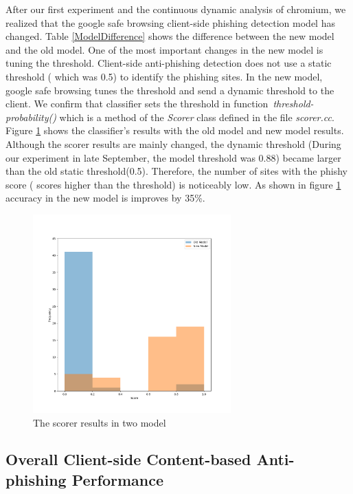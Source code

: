 After our first experiment and the continuous dynamic analysis of chromium, we realized that the google safe browsing client-side phishing detection model has changed. 
Table \ref{ModelDifference} shows the difference between the new model and the old model. One of the most important changes in the new model is tuning the threshold.
Client-side anti-phishing detection does not use a static threshold ( which was 0.5) to identify the phishing sites. In the new model, google safe browsing tunes the threshold and send a dynamic threshold to the client. 
We confirm that classifier sets the threshold in function~\textit{threshold-probability()} which is a method of the \textit{Scorer} class defined in the file \textit{scorer.cc}. 
Figure \ref{fig:two model} shows the classifier's results with the old model and new model results. Although the scorer results are mainly changed, the dynamic threshold (During our experiment in late September, the model threshold was 0.88) became larger than the old static threshold(0.5). Therefore, the number of sites with the phishy score ( scores higher than the threshold) is noticeably low.
As shown in figure \ref{fig:two model} accuracy in the new model is improves by 35\%. 

 \begin{figure}
\centering
\includegraphics[height=3in, width=3in]{figures/Histogram.png}
\caption{The scorer results in two model }
\label{fig:two model}
\end{figure} 

\subsection{Overall Client-side Content-based Anti-phishing Performance}

